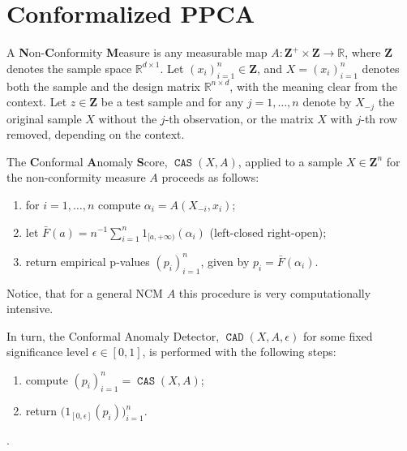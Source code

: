 \documentclass[a4paper,14pt]{article}
\newcommand{\Real}{\mathbb{R}}
\begin{document}


\section{Conformalized PPCA} %
\label{sec:conformalized_ppca}

A \textbf{N}on-\textbf{C}onformity \textbf{M}easure is any measurable map
$A: \mathbf{Z}^+\times \mathbf{Z} \to \Real$, where $\mathbf{Z}$ denotes the sample
space $\Real^{d\times1}$. Let $(x_i)_{i=1}^n\in\mathbf{Z}$, and $X = (x_i)_{i=1}^n$
denotes both the sample and the design matrix $\Real^{n\times d}$, with the meaning
clear from the context. Let $z \in \mathbf{Z}$ be a test sample and for any $j=1,\ldots,n$
denote by $X_{-j}$ the original sample $X$ without the $j$-th observation, or the matrix
$X$ with $j$-th row removed, depending on the context.

The \textbf{C}onformal \textbf{A}nomaly \textbf{S}core, $\mathop{\mathtt{CAS}}\nolimits(X, A)$,
applied to a sample $X\in \mathbf{Z}^n$ for the non-conformity measure $A$ proceeds
as follows:
\begin{enumerate}
    \item for $i=1,\ldots, n$ compute $\alpha_i = A(X_{-i}, x_i)$;
    \item let $\bar{F}(a) = n^{-1} \sum_{i=1}^n 1_{[a, +\infty)}(\alpha_i)$ (left-closed right-open);
    \item return empirical p-values $(p_i)_{i=1}^n$, given by $p_i = \bar{F}(\alpha_i)$.
\end{enumerate}
Notice, that for a general NCM $A$ this procedure is very computationally intensive.

In turn, the Conformal Anomaly Detector, $\mathop{\mathtt{CAD}}\nolimits(X, A, \epsilon)$
for some fixed significance level $\epsilon\in[0,1]$, is performed with the following
steps:
\begin{enumerate}
    \item compute $(p_i)_{i=1}^n = \mathop{\mathtt{CAS}}\nolimits(X, A)$;
    \item return $ \bigl(1_{[0,\epsilon]}(p_i)\bigr)_{i=1}^n$.
\end{enumerate}.
\end{document}
